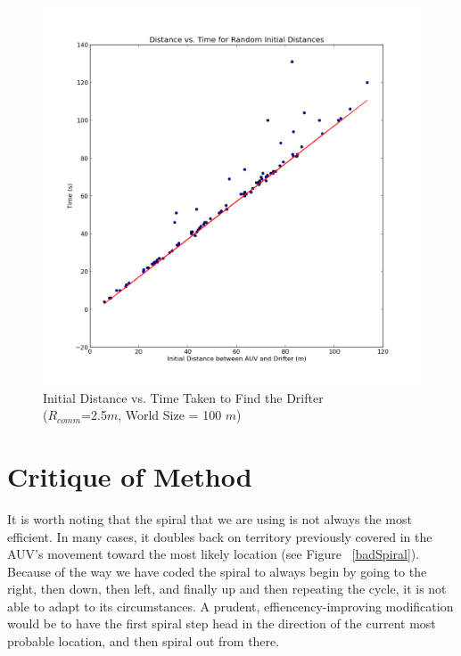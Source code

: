 \documentclass[a4paper, 11pt]{article} %
\begin{document}
\begin{figure}[H]
	\begin{center}
		\includegraphics[scale=0.30]{distance_calculation_rcomm25.png}
	\end{center}
\caption{Initial Distance vs. Time Taken to Find the Drifter\\ ($R_{comm}$=2.5$m$, World Size = 100 $m$) \label{distanceVTime2.5}}
\end{figure}

\section*{Critique of Method}

It is worth noting that the spiral that we are using is not always the most efficient. In many cases, it doubles back on territory previously covered in the AUV's movement toward the most likely location (see Figure ~\ref{badSpiral}). Because of the way we have coded the spiral to always begin by going to the right, then down, then left, and finally up and then repeating the cycle, it is not able to adapt to its circumstances. A prudent, effiencency-improving modification would be to have the first spiral step head in the direction of the current most probable location, and then spiral out from there. \\
\end{document}
